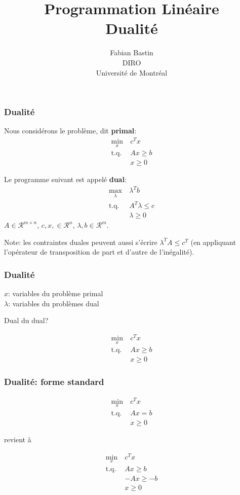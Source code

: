 \documentclass[usepdftitle=false]{beamer}
\title[Dualité]{Programmation Linéaire\\Dualité}
\author[Fabian Bastin]{Fabian Bastin\\DIRO\\Université de Montréal\\}
\date{}
\def\cR{\mathcal{R}}
\begin{document}
\frame{\titlepage}


\begin{frame}
\frametitle{Dualité}

Nous considérons le problème, dit {\bf primal}:
\begin{align*}
\min_x \ & c^T x \\
\mbox{t.q. } & Ax \geq b \\
& x \geq 0
\end{align*}

\mbox{}

Le programme suivant est appelé {\bf dual}:
\begin{align*}
\max_{\lambda} \ & \lambda^T b \\
\mbox{t.q. } & A^T \lambda \leq c \\
& \lambda \geq 0
\end{align*}
$A \in \cR^{m \times n}$, $c, x, \in \cR^n$, $\lambda, b \in \cR^m$.

Note: les contraintes duales peuvent aussi s'écrire $\lambda^T A \leq c^T$ (en appliquant l'opérateur de transposition de part et d'autre de l'inégalité).

\end{frame}

\begin{frame}
\frametitle{Dualité}

$x$: variables du problème primal\\
$\lambda$: variables du problèmes dual

\mbox{}

Dual du dual?

\mbox{}

\begin{align*}
\min_x \ & c^T x \\
\mbox{t.q. } & Ax \geq b \\
& x \geq 0
\end{align*}

\end{frame}

\begin{frame}
\frametitle{Dualité: forme standard}

\begin{align*}
\min_x \ & c^T x \\
\mbox{t.q. } & Ax = b \\
& x \geq 0
\end{align*}

revient à

\begin{align*}
\min_x \ & c^T x \\
\mbox{t.q. } & Ax \geq b \\
& -Ax \geq -b \\
& x \geq 0
\end{align*}

\end{frame}
\end{document}
